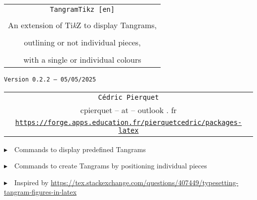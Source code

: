 \documentclass{article}
\def\TPversion{0.2.2}
\def\TPdate{05/05/2025}
\begin{document}
\pagestyle{fancy}

\thispagestyle{empty}

\vspace{2cm}

\begin{center}
	\begin{minipage}{0.75\linewidth}
	\begin{tcolorbox}[colframe=yellow,colback=yellow!15]
		\begin{center}
			\begin{tabular}{c}
				{\Huge \texttt{TangramTikz [en]}}\\
				\\
				{\LARGE An extension of Ti\textit{k}Z to display Tangrams,} \\
				\\
				{\LARGE outlining or not individual pieces,} \\
				\\
				{\LARGE with a single or individual colours} \\
			\end{tabular}
			
			\medskip
			
			{\small \texttt{Version \TPversion{} -- \TPdate}}
		\end{center}
	\end{tcolorbox}
\end{minipage}
\end{center}

\vspace{0.5cm}

\begin{center}
	\begin{tabular}{c}
	\texttt{Cédric Pierquet}\\
	{\ttfamily cpierquet -- at -- outlook . fr}\\
	\texttt{\url{https://forge.apps.education.fr/pierquetcedric/packages-latex}}
\end{tabular}
\end{center}

\vspace{0.5cm}

{$\blacktriangleright$~~Commands to display predefined Tangrams}

\smallskip

{$\blacktriangleright$~~Commands to create Tangrams by positioning individual pieces}

\smallskip

{$\blacktriangleright$~~Inspired by \url{https://tex.stackexchange.com/questions/407449/typesetting-tangram-figures-in-latex}}
\end{document}
